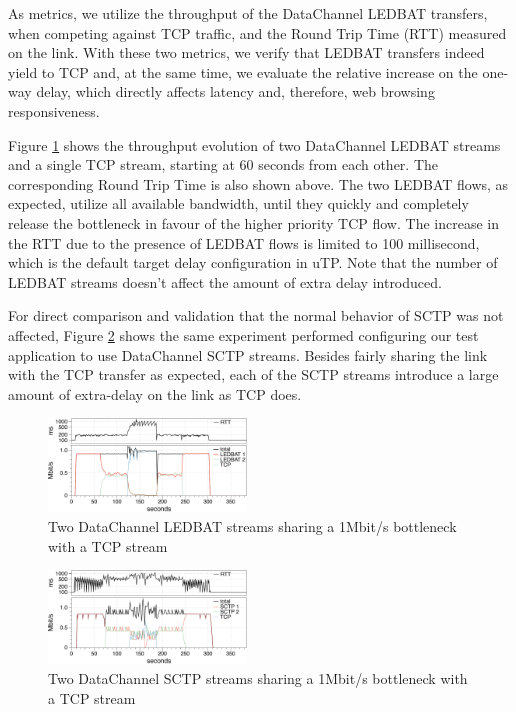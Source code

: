 \documentclass{sig-alternate}
\begin{document}
As metrics, we utilize the throughput of the DataChannel LEDBAT transfers, when competing
against TCP traffic, and the Round Trip Time (RTT) measured on the link. With these two
metrics, we verify that LEDBAT transfers indeed yield to TCP and, at the same time, we
evaluate the relative increase on the one-way delay, which directly affects latency and,
therefore, web browsing responsiveness.

Figure \ref{fig:2ledbat_tcp} shows the throughput evolution of two DataChannel LEDBAT
streams and a single TCP stream, starting at 60 seconds from each other. The corresponding
Round Trip Time is also shown above. The two LEDBAT flows, as expected, utilize all
available bandwidth, until they quickly and completely release the bottleneck in favour of
the higher priority TCP flow. The increase in the RTT due to the presence of LEDBAT flows
is limited to 100 millisecond, which is the default target delay configuration in
uTP. Note that the number of LEDBAT streams doesn't affect the amount of extra delay
introduced.


For direct comparison and validation that the normal behavior of SCTP was not affected,
Figure \ref{fig:2sctp_tcp} shows the same experiment performed configuring our test
application to use DataChannel SCTP streams. Besides fairly sharing the link with the TCP
transfer as expected, each of the SCTP streams introduce a large amount of extra-delay on
the link as TCP does.

\begin{figure}[t]
  \centering
    \includegraphics[width=0.47\textwidth]{figs/2ledbat_tcp}
\vspace*{-0.38cm}
	\caption{Two DataChannel LEDBAT streams sharing a 1Mbit/s bottleneck with a TCP stream} \label{fig:2ledbat_tcp}
\end{figure}

\begin{figure}[t]
  \centering
    \includegraphics[width=0.47\textwidth]{figs/2sctp_tcp}
\vspace*{-0.38cm}
	\caption{Two DataChannel SCTP  streams sharing a 1Mbit/s bottleneck with a TCP stream} \label{fig:2sctp_tcp}
\vspace*{-0.4cm}
\end{figure}



\end{document}
